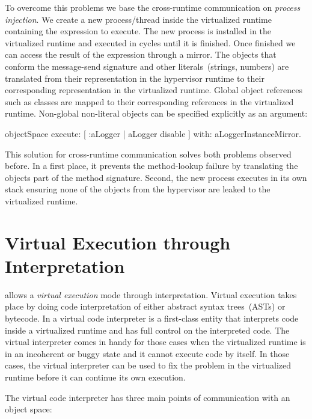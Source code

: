 To overcome this problems we base the cross-runtime communication on \emph{process injection}. We create a new process/thread inside the virtualized runtime containing the expression to execute. The new process is installed in the virtualized runtime and executed in cycles until it is finished. Once finished we can access the result of the expression through a mirror. The objects that conform the message-send signature and other literals~(\eg strings, numbers) are translated from their representation in the hypervisor runtime to their corresponding representation in the virtualized runtime. Global object references such as classes are mapped to their corresponding references in the virtualized runtime. Non-global non-literal objects can be specified explicitly as an argument:

\begin{code}
objectSpace
	execute: [ :aLogger | aLogger disable ]
	with: aLoggerInstanceMirror.
\end{code}

This solution for cross-runtime communication solves both problems observed before. In a first place, it prevents the method-lookup failure by translating the objects part of the method signature. Second, the new process executes in its own stack ensuring none of the objects from the hypervisor are leaked to the virtualized runtime.

\section{Virtual Execution through Interpretation} \label{sec:interpretation}

\Vtt allows a \emph{virtual execution} mode through interpretation. Virtual execution takes place by doing code interpretation of either abstract syntax trees~(ASTs) or bytecode. In \Vtt a virtual code interpreter is a first-class entity that interprets code inside a virtualized runtime and has full control on the interpreted code. The virtual interpreter comes in handy for those cases when the virtualized runtime is in an incoherent or buggy state and it cannot execute code by itself. In those cases, the virtual interpreter can be used to fix the problem in the virtualized runtime before it can continue its own execution.

The virtual code interpreter has three main points of communication with an object space:


